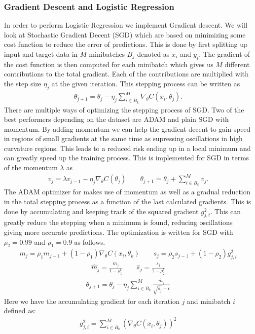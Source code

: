 \documentclass[11pt]{article}
\begin{document}
\subsubsection*{Gradient Descent and Logistic Regression}
In order to perform Logistic Regression we implement Gradient descent. We will look at Stochastic Gradient Decent (SGD) which are based on minimizing some cost function to reduce the error of predictions. This is done by first splitting up input and target data in $M$ minibatches $B_j$ denoted as $x_i$ and $y_i$. The gradient of the cost function is then computed for each minibatch which gives us $M$ different contributions to the total gradient. Each of the contributions are multiplied with the step size $\eta_j$ at the given iteration. This stepping process can be written as
\begin{align*}
    \theta_{j+1} = \theta_j - \eta_j \sum_{i \in B_k}^M \nabla_\theta C(x_i, \theta_j).
\end{align*}
There are multiple ways of optimizing the stepping process of SGD. Two of the best performers depending on the dataset are ADAM and plain SGD with momentum. By adding momentum we can help the gradient decent to gain speed in regions of small gradients at the same time as supressing oscillations in high curvature regions. This leads to a reduced risk ending up in a local minimum and can greatly speed up the training process. This is implemented for SGD in terms of the momentum $\lambda$ as
\begin{align*}
    v_j = \lambda v_{j-1}  - \eta_j \nabla_\theta C(\theta_j) \quad\quad \theta_{j+1} = \theta_j +  \sum_{i \in B_k}^Mv_j.
\end{align*}
The ADAM optimizer for makes use of momentum as well as a gradual reduction in the total stepping process as a function of the last calculated gradients. This is done by accumulating and keeping track of the squared gradient $g_{j,i}^2$. This can greatly reduce the stepping when a minimum is found, reducing oscillations giving more accurate predictions. The optimization is written for SGD with $\rho_2=0.99$ and $\rho_1=0.9$ as follows.
\begin{align*}
    m_j = \rho_1 m_{j-1} + (1-\rho_1)\nabla_\theta C(x_i, \theta_k) \quad\quad s_j = \rho_2 s_{j-1} + (1- \rho_2)g_{j,i}^2
\end{align*}
\begin{align*}
    \hat{m}_j = \frac{m_j }{1-\rho_1^t} \quad\quad \hat{s}_j = \frac{s_j }{1- \rho_2^t}
\end{align*}
\begin{align*}
    \theta_{j+1} = \theta_j - \eta_j\sum_{i \in B_k}^M \frac{\hat{m}_j}{\sqrt{\hat{s}_j} + \epsilon }
\end{align*}
Here we have the accumulating gradient for each iteration $j$ and minibatch $i$ defined as:
\begin{align*}
    g_{j, i}^2 = \sum_{i \in B_k}^M(\nabla_\theta C(x_i, \theta_j))^2
\end{align*}
\end{document}
